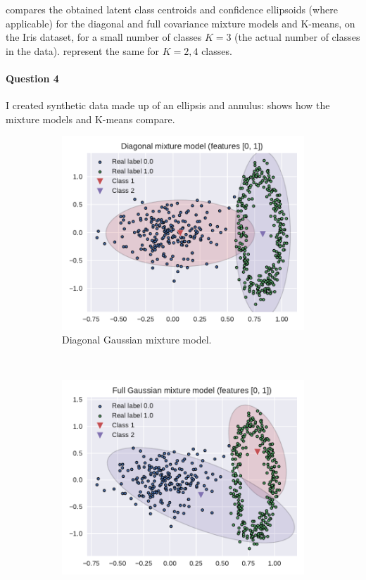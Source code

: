 \documentclass[11pt]{article}
\begin{document}
 compares the obtained latent class centroids and confidence ellipsoids (where applicable) for the diagonal and full covariance mixture models and K-means, on the Iris dataset, for a small number of classes $K=3$ (the actual number of classes in the data).  represent the same for $K =2, 4$ classes.


\paragraph{Question 4} I created synthetic data made up of an ellipsis and annulus:  shows how the mixture models and K-means compare.
\begin{figure}
	\centering
	\begin{subfigure}[t]{.5\linewidth}
	\includegraphics[width=\linewidth]{custom_data/diag_em_K2.pdf}
	\caption{Diagonal Gaussian mixture model.}
	\end{subfigure}~
	\begin{subfigure}[t]{.5\linewidth}
	\includegraphics[width=\linewidth]{custom_data/full_em_K2.pdf}

\end{subfigure}
\end{figure}
\end{document}
